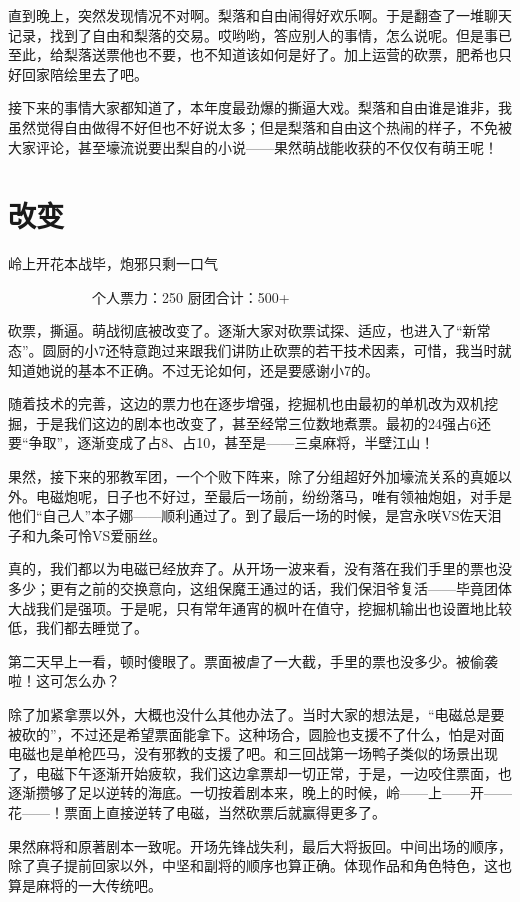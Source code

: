 直到晚上，突然发现情况不对啊。梨落和自由闹得好欢乐啊。于是翻查了一堆聊天记录，找到了自由和梨落的交易。哎哟哟，答应别人的事情，怎么说呢。但是事已至此，给梨落送票他也不要，也不知道该如何是好了。加上运营的砍票，肥希也只好回家陪绘里去了吧。

接下来的事情大家都知道了，本年度最劲爆的撕逼大戏。梨落和自由谁是谁非，我虽然觉得自由做得不好但也不好说太多；但是梨落和自由这个热闹的样子，不免被大家评论，甚至壕流说要出梨自的小说——果然萌战能收获的不仅仅有萌王呢！


\section{改变}
岭上开花本战毕，炮邪只剩一口气

　　　　　　个人票力：250 厨团合计：500+

砍票，撕逼。萌战彻底被改变了。逐渐大家对砍票试探、适应，也进入了“新常态”。圆厨的小7还特意跑过来跟我们讲防止砍票的若干技术因素，可惜，我当时就知道她说的基本不正确。不过无论如何，还是要感谢小7的。

随着技术的完善，这边的票力也在逐步增强，挖掘机也由最初的单机改为双机挖掘，于是我们这边的剧本也改变了，甚至经常三位数地煮票。最初的24强占6还要“争取”，逐渐变成了占8、占10，甚至是——三桌麻将，半壁江山！

果然，接下来的邪教军团，一个个败下阵来，除了分组超好外加壕流关系的真姬以外。电磁炮呢，日子也不好过，至最后一场前，纷纷落马，唯有领袖炮姐，对手是他们“自己人”本子娜——顺利通过了。到了最后一场的时候，是宫永咲VS佐天泪子和九条可怜VS爱丽丝。

真的，我们都以为电磁已经放弃了。从开场一波来看，没有落在我们手里的票也没多少；更有之前的交换意向，这组保魔王通过的话，我们保泪爷复活——毕竟团体大战我们是强项。于是呢，只有常年通宵的枫叶在值守，挖掘机输出也设置地比较低，我们都去睡觉了。

第二天早上一看，顿时傻眼了。票面被虐了一大截，手里的票也没多少。被偷袭啦！这可怎么办？

除了加紧拿票以外，大概也没什么其他办法了。当时大家的想法是，“电磁总是要被砍的”，不过还是希望票面能拿下。这种场合，圆脸也支援不了什么，怕是对面电磁也是单枪匹马，没有邪教的支援了吧。和三回战第一场鸭子类似的场景出现了，电磁下午逐渐开始疲软，我们这边拿票却一切正常，于是，一边咬住票面，也逐渐攒够了足以逆转的海底。一切按着剧本来，晚上的时候，岭——上——开——花——！票面上直接逆转了电磁，当然砍票后就赢得更多了。

果然麻将和原著剧本一致呢。开场先锋战失利，最后大将扳回。中间出场的顺序，除了真子提前回家以外，中坚和副将的顺序也算正确。体现作品和角色特色，这也算是麻将的一大传统吧。

